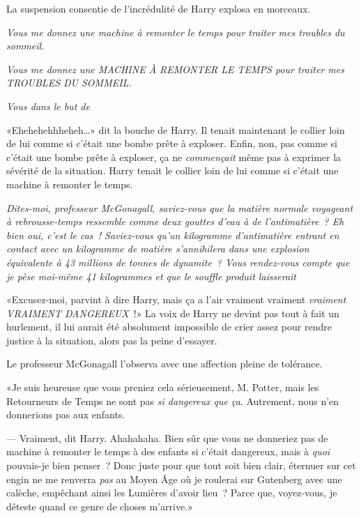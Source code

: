 La suspension consentie de l'incrédulité de Harry explosa en morceaux.

\emph{Vous me donnez une machine à remonter le temps pour traiter mes troubles du sommeil.}

\emph{Vous me donnez une MACHINE À REMONTER LE TEMPS pour traiter mes TROUBLES DU SOMMEIL.}

\emph{Vous  dans le but de }

«Ehehehehhheheh…» dit la bouche de Harry. Il tenait maintenant le collier loin de lui comme si c'était une bombe prête à exploser. Enfin, non, pas comme si c'était une bombe prête à exploser, ça ne \emph{commençait} même pas à exprimer la sévérité de la situation. Harry tenait le collier loin de lui comme si c'était une machine à remonter le temps.

\emph{Dites-moi, professeur McGonagall, saviez-vous que la matière normale voyageant à rebrousse-temps ressemble comme deux gouttes d'eau à de l'antimatière~? Eh bien oui, c'est le cas~! Saviez-vous qu'un kilogramme d'antimatière entrant en contact avec un kilogramme de matière s'annihilera dans une explosion équivalente à 43 millions de tonnes de dynamite~? Vous rendez-vous compte que je pèse moi-même 41 kilogrammes et que le souffle produit laisserait }

«Excusez-moi, parvint à dire Harry, mais ça a l'air vraiment vraiment \emph{vraiment} \emph{VRAIMENT DANGEREUX}~!» La voix de Harry ne devint pas tout à fait un hurlement, il lui aurait été absolument impossible de crier assez pour rendre justice à la situation, alors pas la peine d'essayer.

Le professeur McGonagall l'observa avec une affection pleine de tolérance.

«Je suis heureuse que vous preniez cela sérieusement, M. Potter, mais les Retourneurs de Temps ne sont pas \emph{si dangereux que ça}. Autrement, nous n'en donnerions pas aux enfants.

--- Vraiment, dit Harry. Ahahahaha. Bien sûr que vous ne donneriez pas de machine à remonter le temps à des enfants si c'était dangereux, mais à \emph{quoi} pouvais-je bien penser~? Donc juste pour que tout soit bien clair, éternuer sur cet engin ne me renverra \emph{pas} au Moyen Âge où je roulerai sur Gutenberg avec une calèche, empêchant ainsi les Lumières d'avoir lieu~? Parce que, voyez-vous, je déteste quand ce genre de choses m'arrive.»

